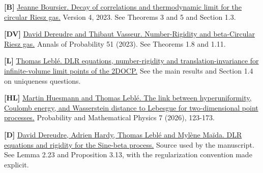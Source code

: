 \documentclass[11pt]{article}
\begin{document}
\textbf{[B]} \href{https://arxiv.org/abs/2209.00396}{Jeanne Boursier. Decay of correlations and thermodynamic limit for the circular Riesz gas.} Version 4, 2023. See Theorems 3 and 5 and Section 1.3.

\textbf{[DV]} \href{https://arxiv.org/abs/2104.09408}{David Dereudre and Thibaut Vasseur. Number-Rigidity and beta-Circular Riesz gas.} Annals of Probability 51 (2023). See Theorems 1.8 and 1.11.

\textbf{[L]} \href{https://arxiv.org/abs/2410.04958}{Thomas Leblé. DLR equations, number-rigidity and translation-invariance for infinite-volume limit points of the 2DOCP.} See the main results and Section 1.4 on uniqueness questions.

\textbf{[HL]} \href{https://arxiv.org/abs/2404.18588}{Martin Huesmann and Thomas Leblé. The link between hyperuniformity, Coulomb energy, and Wasserstein distance to Lebesgue for two-dimensional point processes.} Probability and Mathematical Physics 7 (2026), 123-173.

\textbf{[D]} \href{https://arxiv.org/abs/1809.03989}{David Dereudre, Adrien Hardy, Thomas Leblé and Mylène Maïda. DLR equations and rigidity for the Sine-beta process.} Source used by the manuscript. See Lemma 2.23 and Proposition 3.13, with the regularization convention made explicit.
\end{document}
